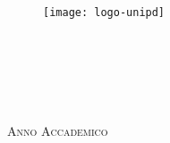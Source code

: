 
\begin{titlepage}

\begin{center}

\begin{LARGE}
\textbf{\myUni}\\
\end{LARGE}

\vspace{10pt}

\begin{Large}
\textsc{\myDepartment}\\
\end{Large}

\vspace{10pt}

\begin{large}
\textsc{\myFaculty}\\
\end{large}

\vspace{30pt}
\begin{figure}[htbp]
\begin{center}
\texttt{[image: logo-unipd]}
\end{center}
\end{figure}
\vspace{30pt} 

\begin{LARGE}
\begin{center}
\textbf{\myTitle}\\
\end{center}
\end{LARGE}

\vspace{10pt} 

\begin{large}
\textsl{\myDegree}\\
\end{large}

\vspace{40pt} 

\begin{large}
\begin{center}
\vspace{5pt} 
\myName \\
\vspace{5pt} 
\myMat
\end{center}
\end{large}

\vspace{40pt}

\begin{normalsize}
\textsc{Anno Accademico \myAA}
\end{normalsize}

\end{center}
\end{titlepage} 